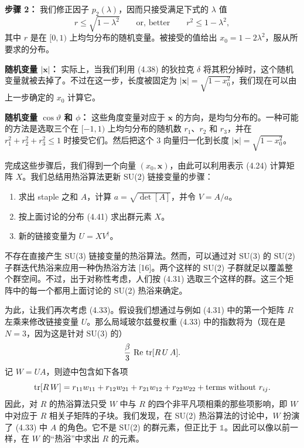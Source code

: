 \textbf{步骤 2：} 我们修正因子 $p_2(\lambda)$，因而只接受满足下式的 $\lambda$ 值
\begin{equation}
  r \leq \sqrt{1-\lambda^2} \qquad \text{or, better} \qquad r^2 \leq 1-\lambda^2,
\end{equation}
其中 $r$ 是在 $[0,1)$ 上均匀分布的随机变量。被接受的值给出 $x_0 = 1 - 2\lambda^2$，服从所要求的分布。

\textbf{随机变量 $|\mathbf{x}|$：} 实际上，当我们利用 (4.38) 的狄拉克 $\delta$ 将其积分掉时，这个随机变量就被去掉了。不过在这一步，长度被固定为 $|\mathbf{x}| = \sqrt{1-x_0^2}$，我们现在可以由上一步确定的 $x_0$ 计算它。

\textbf{随机变量 $\cos\vartheta$ 和 $\phi$：} 这些角度变量对应于 $\mathbf{x}$ 的方向，是均匀分布的。一种可能的方法是选取三个在 $[-1,1)$ 上均匀分布的随机数 $r_1$、$r_2$ 和 $r_3$，并在 $r_1^2+r_2^2+r_3^2 \leq 1$ 时接受它们。然后把这个 3 向量归一化到长度 $|\mathbf{x}| = \sqrt{1-x_0^2}$。

完成这些步骤后，我们得到一个向量 $(x_0, \mathbf{x})$，由此可以利用表示 (4.24) 计算矩阵 $X$。我们总结用热浴算法更新 SU(2) 链接变量的步骤：
\begin{enumerate}
  \item 求出 staple 之和 $A$，计算 $a = \sqrt{\det[A]}$，并令 $V = A/a$。
  \item 按上面讨论的分布 (4.41) 求出群元素 $X$。
  \item 新的链接变量为 $U = X V^\dagger$。
\end{enumerate}

不存在直接产生 SU(3) 链接变量的热浴算法。然而，可以通过对 SU(3) 的 SU(2) 子群迭代热浴来应用一种伪热浴方法 [16]。两个这样的 SU(2) 子群就足以覆盖整个群空间。不过，出于对称性考虑，人们按 (4.31) 选取三个这样的群。这三个矩阵中的每一个都用上面讨论的 SU(2) 热浴来确定。

为此，让我们再次考虑 (4.33)。假设我们想通过与例如 (4.31) 中的第一个矩阵 $R$ 左乘来修改链接变量 $U$。那么局域玻尔兹曼权重 (4.33) 中的指数将为（现在是 $N = 3$，因为这是针对 SU(3) 的）
\begin{equation}
  \frac{\beta}{3}\,\operatorname{Re}\,\operatorname{tr}[R\,U\,A].
\end{equation}
记 $W = U A$，则迹中包含如下各项
\begin{equation}
  \operatorname{tr}[R\,W] = r_{11}w_{11} + r_{12}w_{21} + r_{21}w_{12} + r_{22}w_{22}
  + \text{terms without } r_{ij}.
\end{equation}
因此，对 $R$ 的热浴算法只受 $W$ 中与 $R$ 的四个非平凡项相乘的那些项影响，即 $W$ 中对应于 $R$ 相关子矩阵的子块。我们发现，在 SU(2) 热浴算法的讨论中，$W$ 扮演了 (4.33) 中 $A$ 的角色。它不是 SU(2) 的群元素，但正比于 $\mathbb{1}$。因此可以像以前一样，在 $W$ 的“热浴”中求出 $R$ 的元素。

